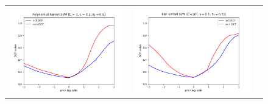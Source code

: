 \documentclass[12pt,a4paper]{article}
\begin{document}
\begin{figure}[H]
    \begin{center}
        \hspace*{-25pt}
        \begin{tabular}{ccc}
            \includegraphics[width = 200pt]{img/bayes/bayes-error-plot-polynomial-kernel-svm.png} &
            \includegraphics[width = 200pt]{img/bayes/bayes-error-plot-rbf-kernel-svm.png}         \\
        \end{tabular}
    \end{center}
\end{figure}
\end{document}
